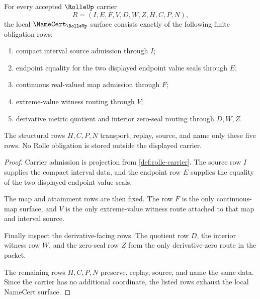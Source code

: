 \begin{theorem}
\label{thm:rolle-namecert-obligations}
For every accepted $\RolleUp$ carrier
$$
R=(I,E,F,V,D,W,Z,H,C,P,N),
$$
the local $\NameCert_{\RolleUp}$ surface consists exactly of the following finite obligation rows:
\begin{enumerate}
\item compact interval source admission through $I$;
\item endpoint equality for the two displayed endpoint value seals through $E$;
\item continuous real-valued map admission through $F$;
\item extreme-value witness routing through $V$;
\item derivative metric quotient and interior zero-seal routing through $D,W,Z$.
\end{enumerate}
The structural rows $H,C,P,N$ transport, replay, source, and name only these five rows. No Rolle obligation is stored outside the displayed carrier.
\end{theorem}
\begin{proof}
Carrier admission is projection from \autoref{def:rolle-carrier}. The source row $I$ supplies the compact interval data, and the endpoint row $E$ supplies the equality of the two displayed endpoint value seals.

The map and attainment rows are then fixed. The row $F$ is the only continuous-map surface, and $V$ is the only extreme-value witness route attached to that map and interval source.

Finally inspect the derivative-facing rows. The quotient row $D$, the interior witness row $W$, and the zero-seal row $Z$ form the only derivative-zero route in the packet.

The remaining rows $H,C,P,N$ preserve, replay, source, and name the same data. Since the carrier has no additional coordinate, the listed rows exhaust the local NameCert surface.
\end{proof}


